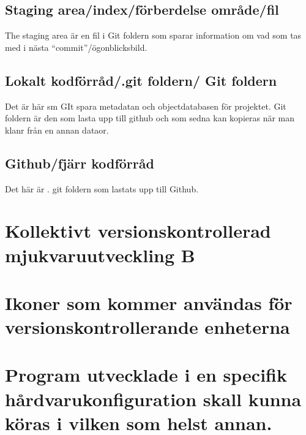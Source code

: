 \documentclass[
  letterpaper,
  DIV=11,
  numbers=noendperiod]{scrreprt}
\begin{document}
\section{Staging area/index/förberdelse
område/fil}\label{staging-areaindexfuxf6rberdelse-omruxe5defil}

The staging area är en fil i Git foldern som sparar information om vad
som tas med i nästa ``commit''/ögonblicksbild.

\section{Lokalt kodförråd/.git foldern/ Git
foldern}\label{lokalt-kodfuxf6rruxe5d.git-foldern-git-foldern}

Det är här sm GIt spara metadatan och objectdatabasen för projektet. Git
foldern är den som lasta upp till github och som sedna kan kopieras när
man klanr från en annan dataor.

\section{Github/fjärr kodförråd}\label{githubfjuxe4rr-kodfuxf6rruxe5d}

Det här är . git foldern som lastats upp till Github.


\chapter{Kollektivt versionskontrollerad mjukvaruutveckling
B}\label{kollektivt-versionskontrollerad-mjukvaruutveckling-b}


\chapter{Ikoner som kommer användas för versionskontrollerande
enheterna}\label{ikoner-som-kommer-anvuxe4ndas-fuxf6r-versionskontrollerande-enheterna}


\chapter{Program utvecklade i en specifik hårdvarukonfiguration skall
kunna köras i vilken som helst
annan.}\label{program-utvecklade-i-en-specifik-huxe5rdvarukonfiguration-skall-kunna-kuxf6ras-i-vilken-som-helst-annan.}
\end{document}
